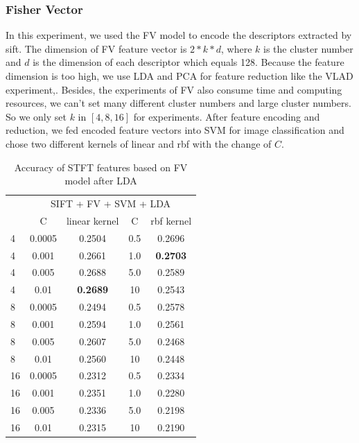 \documentclass[conference]{IEEEtran}
\begin{document}
\subsubsection{Fisher Vector}
\label{sec:FV}
In this experiment, we used the FV model to encode the descriptors extracted by sift. The dimension of FV feature vector is $2*k*d$, where $k$ is the cluster number and $d$ is the dimension of each descriptor which equals 128. Because the feature dimension is too high, we use LDA and PCA for feature reduction like the VLAD experiment,. Besides, the experiments of FV also consume time and computing resources, we can't set many different cluster numbers and large cluster numbers. So we only set $k$ in $[4,8,16]$ for experiments. After feature encoding and reduction, we fed encoded feature vectors into SVM for image classification and chose two different kernels of linear and rbf with the change of $C$.

\begin{table}[htbp]
	\centering
	\newcommand{\tabincell}[2]{\begin{tabular}{@{}#1@{}}#2\end{tabular}}
	\renewcommand\arraystretch{1.0}
	\caption{Accuracy of STFT features based on FV model after LDA}
	\label{base4}%
	\begin{tabular}{@{}p{1cm}<{\centering}|c|c|c|c}
		\hline
		\multirow{2}{*}{\diagbox[height=2\line,width=1.42cm,font=\tiny]{$k$}{Acc.}{$\mathit{M}$}} &
		\multicolumn{4}{c}{SIFT + FV + SVM + LDA}\\
		\cline{2-5}
		& {C} & {linear kernel} & {C} & {rbf kernel}\\
		\hline
		4   & 0.0005  & 0.2504 & 0.5 & 0.2696\\
		4   & 0.001  & 0.2661 & 1.0 & \textbf{0.2703}\\
		4   & 0.005  & 0.2688 & 5.0 & 0.2589\\
        4   & 0.01  & \textbf{0.2689} & 10 & 0.2543\\
        \hline
		8   & 0.0005 & 0.2494 & 0.5 & 0.2578\\
		8   & 0.001 & 0.2594 & 1.0 & 0.2561\\
		8   & 0.005 & 0.2607 & 5.0 & 0.2468\\
        8   & 0.01  & 0.2560 & 10 & 0.2448\\
        \hline
		16   & 0.0005  & 0.2312 & 0.5 & 0.2334\\
		16   & 0.001  & 0.2351 & 1.0 & 0.2280\\
		16   & 0.005  & 0.2336 & 5.0 & 0.2198\\
		16   & 0.01  & 0.2315 & 10 & 0.2190\\
		\hline
	\end{tabular}
\end{table}
\end{document}
